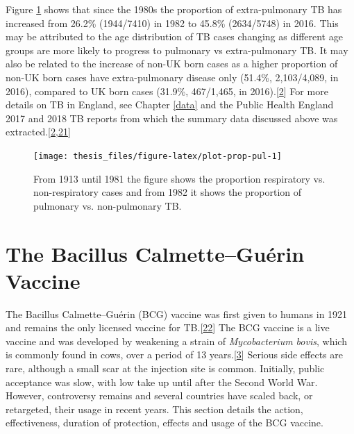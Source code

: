 \documentclass[11pt,twoside]{bristolthesis}
\begin{document}
  Figure \ref{fig:plot-prop-pul} shows that since the 1980s the proportion of extra-pulmonary TB has increased from 26.2\% (1944/7410) in 1982 to 45.8\% (2634/5748) in 2016. This may be attributed to the age distribution of TB cases changing as different age groups are more likely to progress to pulmonary vs extra-pulmonary TB. It may also be related to the increase of non-UK born cases as a higher proportion of non-UK born cases have extra-pulmonary disease only (51.4\%, 2,103/4,089, in 2016), compared to UK born cases (31.9\%, 467/1,465, in 2016).{[}\protect\hyperlink{ref-PHE2017}{2}{]} For more details on TB in England, see Chapter \ref{data} and the Public Health England 2017 and 2018 TB reports from which the summary data discussed above was extracted.{[}\protect\hyperlink{ref-PHE2017}{2},\protect\hyperlink{ref-PHE2018}{21}{]}
  \begin{figure}
  
  {\centering \texttt{[image: thesis\_files/figure-latex/plot-prop-pul-1]} 
  
  }
  
  \caption[From 1913 until 1981 the figure shows the proportion respiratory vs. non-respiratory cases and from 1982 it shows the proportion of pulmonary vs. non-pulmonary TB.]{From 1913 until 1981 the figure shows the proportion respiratory vs. non-respiratory cases and from 1982 it shows the proportion of pulmonary vs. non-pulmonary TB.}\label{fig:plot-prop-pul}
  \end{figure}
  \hypertarget{the-bacillus-calmetteguerin-vaccine}{%
  \section{The Bacillus Calmette--Guérin Vaccine}\label{the-bacillus-calmetteguerin-vaccine}}
  
  The Bacillus Calmette--Guérin (BCG) vaccine was first given to humans in 1921 and remains the only licensed vaccine for TB.{[}\protect\hyperlink{ref-Medicine2013}{22}{]} The BCG vaccine is a live vaccine and was developed by weakening a strain of \emph{Mycobacterium bovis}, which is commonly found in cows, over a period of 13 years.{[}\protect\hyperlink{ref-TheWorldHealthOrganization:2018va}{3}{]} Serious side effects are rare, although a small scar at the injection site is common. Initially, public acceptance was slow, with low take up until after the Second World War. However, controversy remains and several countries have scaled back, or retargeted, their usage in recent years. This section details the action, effectiveness, duration of protection, effects and usage of the BCG vaccine.
  
\end{document}
